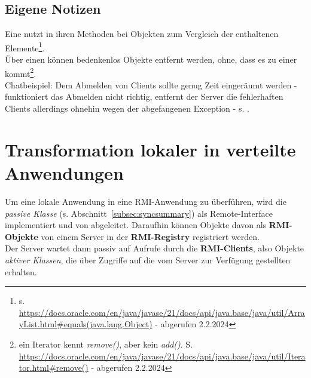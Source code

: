 \subsection*{Eigene Notizen}

\noindent
Eine  nutzt in ihren Methoden bei Objekten  zum Vergleich der enthaltenen Elemente\footnote{
    s. \url{https://docs.oracle.com/en/java/javase/21/docs/api/java.base/java/util/ArrayList.html#equals(java.lang.Object)} - abgerufen 2.2.2024
}.\\

\noindent
Über einen  können bedenkenlos Objekte entfernt werden, ohne, dass es zu einer  kommt\footnote{ein Iterator kennt \textit{remove()}, aber kein \textit{add()}. S. \url{https://docs.oracle.com/en/java/javase/21/docs/api/java.base/java/util/Iterator.html#remove()} - abgerufen 2.2.2024}.\\


\noindent
Chatbeispiel: Dem Abmelden von Clients sollte genug Zeit eingeräumt werden - funktioniert das Abmelden nicht richtig, entfernt der Server die fehlerhaften Clients allerdings ohnehin wegen der abgefangenen Exception - s. \cite[345, Listing 6.22]{Oec22}.


\section{Transformation lokaler in verteilte Anwendungen}

Um eine lokale Anwendung in eine RMI-Anwendung zu überführen, wird die \textit{passive Klasse} (s. Abschnitt~\ref{subsec:syncsummary}) als Remote-Interface implementiert und von  abgeleitet.
Daraufhin können Objekte davon als \textbf{RMI-Objekte} von einem Server in der \textbf{RMI-Registry} registriert werden.\\

\noindent
Der Server wartet dann passiv auf Aufrufe durch die \textbf{RMI-Clients}, also Objekte \textit{aktiver Klassen}, die über  Zugriffe auf die vom Server zur Verfügung gestellten  erhalten.\\

